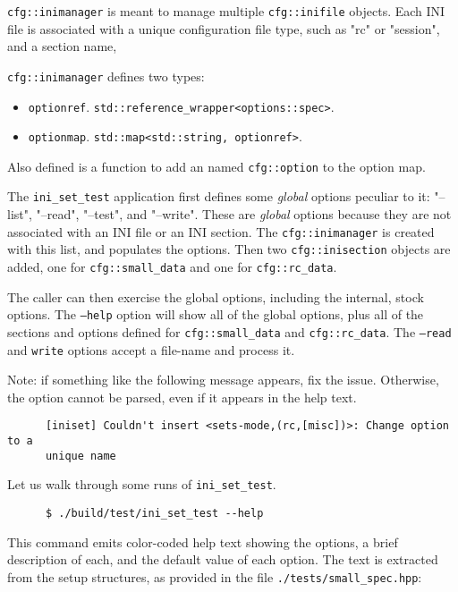    \texttt{cfg::inimanager} is meant to manage multiple
   \texttt{cfg::inifile} objects.
   Each INI file is associated with a unique configuration file type,
   such as "rc" or "session", and a section name,

   \texttt{cfg::inimanager} defines two types:

   \begin{itemize}
      \item \texttt{optionref}.
         \texttt{std::reference\_wrapper<options::spec>}.
      \item \texttt{optionmap}.
         \texttt{std::map<std::string, optionref>}.
   \end{itemize}

   Also defined is a function to add an named \texttt{cfg::option}
   to the option map.

   The \texttt{ini\_set\_test} application first defines some
   \textsl{global} options
   peculiar to it: "--list", "--read", "--test", and "--write".
   These are \textsl{global} options because they are not associated with
   an INI file or an INI section.
   The \texttt{cfg::inimanager} is created with this list, and populates
   the options. Then two \texttt{cfg::inisection} objects are
   added, one for \texttt{cfg::small\_data} and
   one for \texttt{cfg::rc\_data}.

   The caller can then exercise the global options, including the internal,
   stock options.  The \texttt{--help} option will show all of the global
   options, plus all of the sections and options defined for
   \texttt{cfg::small\_data} and
   \texttt{cfg::rc\_data}.
   The \texttt{--read} and \texttt{write} options accept a file-name and
   process it.

   Note: if something like the following message appears, fix the issue.
   Otherwise, the option cannot be parsed, even if it appears in the
   help text.

   \begin{verbatim}
      [iniset] Couldn't insert <sets-mode,(rc,[misc])>: Change option to a
      unique name
   \end{verbatim}

   Let us walk through some runs of
   \texttt{ini\_set\_test}.

   \begin{verbatim}
      $ ./build/test/ini_set_test --help
   \end{verbatim}

   This command emits color-coded help text showing the options, a brief
   description of each, and the default value of each option.
   The text is extracted from the setup structures, as provided in
   the file \texttt{./tests/small\_spec.hpp}:

